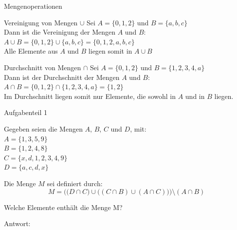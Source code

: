 \documentclass[18pt]{beamer}
\begin{document}
	\begin{frame}{Mengenoperationen}
		\begin{block}{Vereinigung von Mengen $\cup$}
			Sei $A = \{0,1,2\}$ und $B = \{a,b,c\}$\\
			Dann ist die Vereinigung der Mengen $A$ und $B$:\\
			$A \cup B = \{0,1,2\} \cup \{a,b,c\} = \{0,1,2,a,b,c\}$\\
			Alle Elemente aus $A$ und $B$ liegen somit in $A \cup B$

		\end{block}
		\pause

		\begin{block}{Durchschnitt von Mengen $\cap$}
			Sei $A = \{0,1,2\}$ und $B = \{1,2,3,4,a\}$\\
			Dann ist der Durchschnitt der Mengen $A$ und $B$:\\
			$A \cap B = \{0,1,2\} \cap \{1,2,3,4,a\} = \{1, 2\}$\\
			Im Durchschnitt liegen somit nur Elemente, die sowohl in $A$ und in $B$ liegen.

		\end{block}

	\end{frame}



	\begin{frame}{Aufgabenteil 1}

		Gegeben seien die Mengen $A$, $B$, $C$ und $D$, mit:\\
		$A = \{1,3,5,9\}$\\
		$B = \{1,2,4,8\}$\\
		$C = \{x,d,1,2,3,4,9\}$\\
		$D = \{a,c,d,x\}$
		\vspace{10pt}
		
		Die Menge $M$ sei definiert durch:\\
		\[
			M = \Big(\big(D \cap C\big)\cup\big((C \cap B)\cup(A \cap C)\big)\Big) \setminus (A \cap B)
		\]
		
		Welche Elemente enth\"alt die Menge M?
		\vspace{10pt}	
			
		Antwort: 
		\visible<2>{\color{darkgreen}$M= \{d,x,2,3,4,9\}$}
 	\end{frame}
 	
\end{document}
